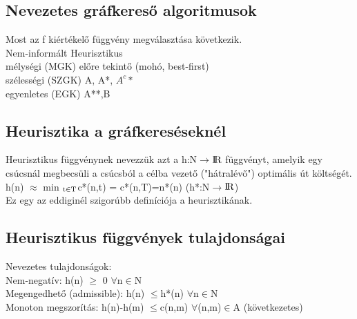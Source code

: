 \documentclass{article}
\begin{document}
	 \subsection{Nevezetes gráfkereső algoritmusok}
	 Most az f kiértékelő függvény megválasztása következik.\\
	 Nem-informált \hspace{10em} Heurisztikus\\
	 mélységi (MGK) \hspace{10em} előre tekintő (mohó, best-first)\\
	 szélességi (SZGK) \hspace{10em} A, A*, $A^c*$\\
	 egyenletes (EGK) \hspace{10em} A**,B\\
	 
	 \subsection{Heurisztika a gráfkereséseknél}
	 Heurisztikus függvénynek nevezzük azt a h:N$\rightarrow$${\rm I\!R}$ függvényt, amelyik egy csúcsnál megbecsüli a csúcsból a célba vezető ("hátralévő") optimális út költségét.\\
	 h(n) $\approx$ min $\textsubscript{t$\in$T}$c*(n,t) = c*(n,T)=n*(n) (h*:N$\rightarrow$${\rm I\!R}$)\\
	 Ez egy az eddiginél szigorúbb definíciója a heurisztikának.\\
	 
	 \subsection{Heurisztikus függvények tulajdonságai}
	 Nevezetes tulajdonságok:\\
	 Nem-negatív: h(n) $\geq$ 0 $\forall$n$\in$N\\
	 Megengedhető (admissible): h(n) $\leq$h*(n) $\forall$n$\in$N\\
	 Monoton megszorítás: h(n)-h(m) $\leq$c(n,m) $\forall$(n,m)$\in$A (következetes)\\
	 
\end{document}
